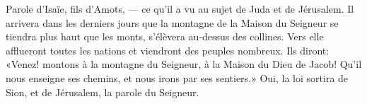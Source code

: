 Parole d’Isaïe, fils d’Amots,
	--- ce qu’il a vu au sujet de Juda et de Jérusalem.
Il arrivera dans les derniers jours
	que la montagne de la Maison du Seigneur se tiendra plus haut que les monts,
	s’élèvera au-dessus des collines.
Vers elle afflueront toutes les nations et viendront des peuples nombreux.
	Ils diront: «Venez! montons à la montagne du Seigneur,
	à la Maison du Dieu de Jacob!
	Qu’il nous enseigne ses chemins, et nous irons par ses sentiers.»
Oui, la loi sortira de Sion,
	et de Jérusalem, la parole du Seigneur.
